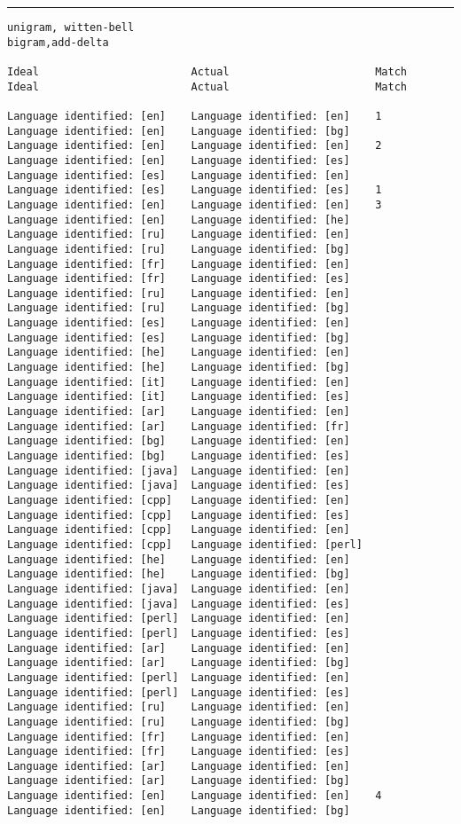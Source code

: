 \tiny
\hrule\vskip4pt
\begin{verbatim}
unigram, witten-bell                                              bigram,add-delta

Ideal                        Actual                       Match   Ideal                        Actual                       Match

Language identified: [en]    Language identified: [en]    1       Language identified: [en]    Language identified: [bg]
Language identified: [en]    Language identified: [en]    2       Language identified: [en]    Language identified: [es]
Language identified: [es]    Language identified: [en]            Language identified: [es]    Language identified: [es]    1
Language identified: [en]    Language identified: [en]    3       Language identified: [en]    Language identified: [he]
Language identified: [ru]    Language identified: [en]            Language identified: [ru]    Language identified: [bg]
Language identified: [fr]    Language identified: [en]            Language identified: [fr]    Language identified: [es]
Language identified: [ru]    Language identified: [en]            Language identified: [ru]    Language identified: [bg]
Language identified: [es]    Language identified: [en]            Language identified: [es]    Language identified: [bg]
Language identified: [he]    Language identified: [en]            Language identified: [he]    Language identified: [bg]
Language identified: [it]    Language identified: [en]            Language identified: [it]    Language identified: [es]
Language identified: [ar]    Language identified: [en]            Language identified: [ar]    Language identified: [fr]
Language identified: [bg]    Language identified: [en]            Language identified: [bg]    Language identified: [es]
Language identified: [java]  Language identified: [en]            Language identified: [java]  Language identified: [es]
Language identified: [cpp]   Language identified: [en]            Language identified: [cpp]   Language identified: [es]
Language identified: [cpp]   Language identified: [en]            Language identified: [cpp]   Language identified: [perl]
Language identified: [he]    Language identified: [en]            Language identified: [he]    Language identified: [bg]
Language identified: [java]  Language identified: [en]            Language identified: [java]  Language identified: [es]
Language identified: [perl]  Language identified: [en]            Language identified: [perl]  Language identified: [es]
Language identified: [ar]    Language identified: [en]            Language identified: [ar]    Language identified: [bg]
Language identified: [perl]  Language identified: [en]            Language identified: [perl]  Language identified: [es]
Language identified: [ru]    Language identified: [en]            Language identified: [ru]    Language identified: [bg]
Language identified: [fr]    Language identified: [en]            Language identified: [fr]    Language identified: [es]
Language identified: [ar]    Language identified: [en]            Language identified: [ar]    Language identified: [bg]
Language identified: [en]    Language identified: [en]    4       Language identified: [en]    Language identified: [bg]


\end{verbatim}
